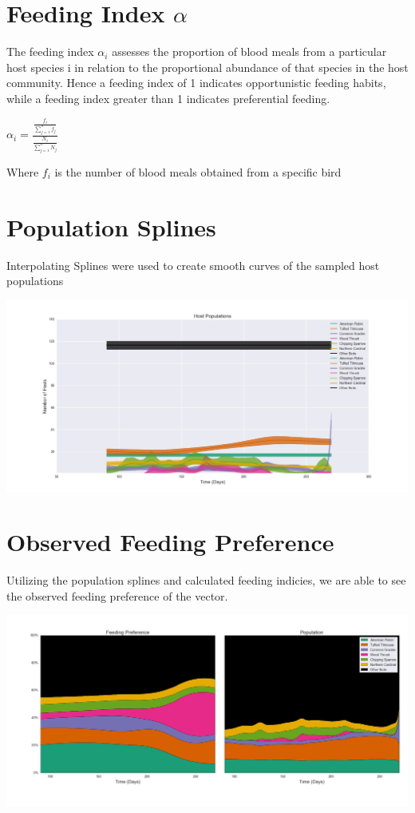 \documentclass[landscape]{sciposter}
\begin{document}
\begin{multicols}{3}
\section*{Feeding Index $\alpha$}
The feeding index $\alpha_i$ assesses the proportion of blood meals from a particular host species i in relation to the proportional abundance of that species in the host community.  Hence a feeding index of 1 indicates opportunistic feeding habits, while a feeding index greater than 1 indicates preferential feeding. \\
\begin{center}
$\alpha_i= \frac{\frac{f_i}{\sum\limits_{j=1}^nf_j}}{\frac{N_i}{\sum\limits_{j=1}^nN_j}}$ 
\end{center}
Where $f_i$ is the number of blood meals obtained from a specific bird

\columnbreak
\section*{Population Splines}
Interpolating Splines were used to create smooth curves of the sampled host populations \\
\begin{center}
\includegraphics[width=\linewidth]{Populations}
\end{center}


\section*{Observed Feeding Preference}
Utilizing the population splines and calculated feeding indicies, we are able to see the observed feeding preference of the vector. \\
\begin{center}
\includegraphics[width=\linewidth]{FeedingPreference}
\end{center}
 

\end{multicols}
\end{document}
